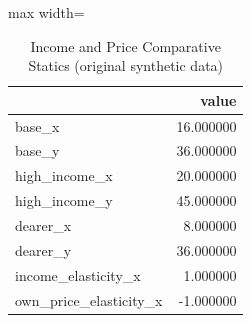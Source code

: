 \begin{table}[htbp]
\centering
\caption{Income and Price Comparative Statics (original synthetic data)}
\begingroup
\small
\setlength{\tabcolsep}{6pt}
\renewcommand{\arraystretch}{1.12}
\begin{adjustbox}{max width=\linewidth}
\begin{tabular}{@{}lr@{}}
\toprule
 & value \\
\midrule
base\_x & 16.000000 \\
base\_y & 36.000000 \\
high\_income\_x & 20.000000 \\
high\_income\_y & 45.000000 \\
dearer\_x & 8.000000 \\
dearer\_y & 36.000000 \\
income\_elasticity\_x & 1.000000 \\
own\_price\_elasticity\_x & -1.000000 \\
\bottomrule
\end{tabular}
\end{adjustbox}
\endgroup
\end{table}